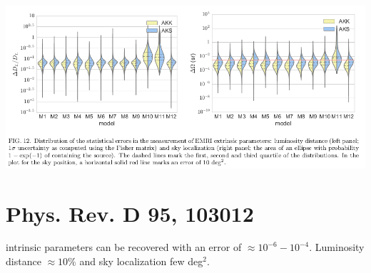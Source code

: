 \includegraphics[width=\textwidth]{img/extrinsic_parameter_estimation.png}

\section{Phys. Rev. D 95, 103012}
intrinsic parameters can be recovered with an error of $\approx 10^{-6} -10^{-4}$.
Luminosity distance $\approx 10\%$ and sky localization few deg$^2$.
